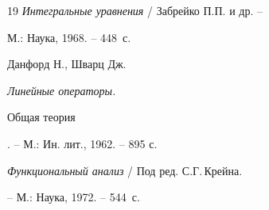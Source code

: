 \begin{thebibliography}{19}
 {\em Интегральные уравнения} / Забрейко П.П. и др. --


М.: Наука, 1968. -- 448~с.





 Данфорд Н., Шварц Дж. {\em Линейные операторы.


Общая теория}. -- М.: Ин. лит., 1962. -- 895 с.





 {\em Функциональный анализ} / Под ред. С.Г.\,Крейна.


-- М.: Наука, 1972. -- 544~с.





\end{thebibliography}





\vskip 2cm















\label{end}





